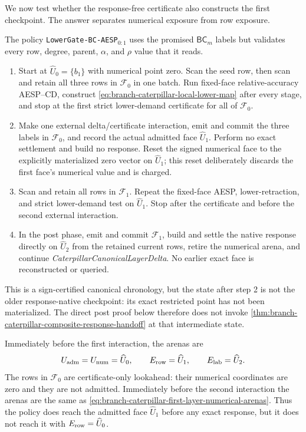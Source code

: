 We now test whether the response-free certificate also constructs the first
checkpoint.  The answer separates numerical exposure from row exposure.

\begin{definition}
\label{def:branch-caterpillar-two-face-lower-policy}
The policy \texttt{LowerGate-BC-AESP}$_{0:1}$ uses the promised
$\mathsf{BC}_m$ labels but validates every row, degree, parent, $\alpha$, and
$\rho$ value that it reads.
\begin{enumerate}
 \item Start at $\widehat U_0=\{b_1\}$ with numerical point zero.  Scan the
       seed row, then scan and retain all three rows in $\mathcal F_0$ in one
       batch.  Run fixed-face relative-accuracy AESP--CD, construct
       \cref{eq:branch-caterpillar-local-lower-map} after every stage, and
       stop at the first strict lower-demand certificate for all of
       $\mathcal F_0$.
 \item Make one external delta/certificate interaction, emit and commit the
       three labels in $\mathcal F_0$, and record the actual admitted face
       $\widehat U_1$.  Perform no exact settlement and build no response.
       Reset the signed numerical face to the explicitly materialized zero
       vector on $\widehat U_1$; this reset deliberately discards the first
       face's numerical value and is charged.
 \item Scan and retain all rows in $\mathcal F_1$.  Repeat the fixed-face
       AESP, lower-retraction, and strict lower-demand test on
       $\widehat U_1$.  Stop after the certificate and before the second
       external interaction.
 \item In the post phase, emit and commit $\mathcal F_1$, build and settle the
       native response directly on $\widehat U_2$ from the retained current
       rows, retire the numerical arena, and continue
       \emph{CaterpillarCanonicalLayerDelta}.  No earlier exact face is
       reconstructed or queried.
\end{enumerate}
This is a sign-certified canonical chronology, but the state after step 2 is
not the older response-native checkpoint: its exact restricted point has not
been materialized.  The direct post proof below therefore does not invoke
\cref{thm:branch-caterpillar-composite-response-handoff} at that intermediate
state.
\end{definition}

Immediately before the first interaction, the arenas are
\begin{equation}
 U_{\rm adm}=U_{\rm num}=\widehat U_0,
 \qquad E_{\rm row}=\widehat U_1,
 \qquad E_{\rm lab}=\widehat U_2.
 \label{eq:branch-caterpillar-lower-first-gate-arenas}
\end{equation}
The rows in $\mathcal F_0$ are certificate-only lookahead: their numerical
coordinates are zero and they are not admitted.  Immediately before the
second interaction the arenas are the same as
\cref{eq:branch-caterpillar-first-layer-numerical-arenas}.  Thus the policy
does reach the admitted face $\widehat U_1$ before any exact response, but it
does not reach it with $E_{\rm row}=\widehat U_0$.

